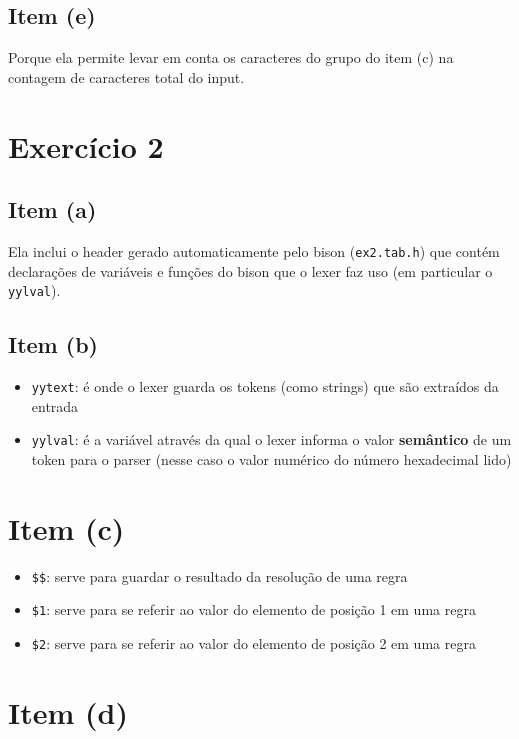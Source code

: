 \documentclass{article}
\begin{document}
\subsection*{Item (e)}

Porque ela permite levar em conta os caracteres do grupo do item (c) na contagem de caracteres total do input.

\section*{Exercício 2}

\subsection*{Item (a)}

Ela inclui o header gerado automaticamente pelo bison (\texttt{ex2.tab.h}) que contém declarações de variáveis e funções do bison que o lexer faz uso (em particular o \texttt{yylval}).

\subsection*{Item (b)}

\begin{itemize}
    \item \texttt{yytext}: é onde o lexer guarda os tokens (como strings) que são extraídos da entrada
    \item \texttt{yylval}: é a variável através da qual o lexer informa o valor \textbf{semântico} de um token para o parser (nesse caso o valor numérico do número hexadecimal lido)
\end{itemize}

\section*{Item (c)}

\begin{itemize}
    \item \texttt{\$\$}: serve para guardar o resultado da resolução de uma regra
    \item \texttt{\$1}: serve para se referir ao valor do elemento de posição 1 em uma regra
    \item \texttt{\$2}: serve para se referir ao valor do elemento de posição 2 em uma regra
\end{itemize}

\section*{Item (d)}
\end{document}
